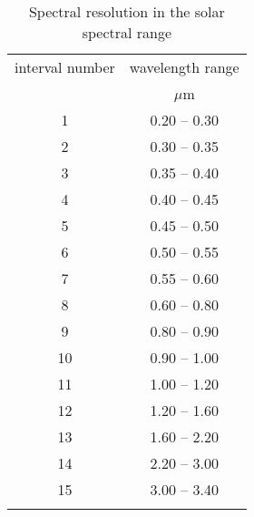 \documentclass[agp]{svjour}
\begin{document}
\begin{table}[b]
\caption[]{Spectral resolution in the solar spectral range}
\begin{tabular*}{84.22mm}{@{\hspace{0pt}\extracolsep{10pt}}cc@{\hspace{0pt}}}
\hline
\noalign{\smallskip}
interval number & wavelength range \\
& $\mu$m \\
\noalign{\smallskip}
\hline
\noalign{\smallskip}
1 & 0.20 -- 0.30 \\
2 & 0.30 -- 0.35 \\
3 & 0.35 -- 0.40 \\
4 & 0.40 -- 0.45 \\
5 & 0.45 -- 0.50 \\
6 & 0.50 -- 0.55 \\
7 & 0.55 -- 0.60 \\
8 & 0.60 -- 0.80 \\
9 & 0.80 -- 0.90 \\
10 & 0.90 -- 1.00 \\
11 & 1.00 -- 1.20 \\
12 & 1.20 -- 1.60 \\
13 & 1.60 -- 2.20 \\
14 & 2.20 -- 3.00 \\
15 & 3.00 -- 3.40 \\
\noalign{\smallskip}
\hline
\end{tabular*}
\label{tab:6}
\end{table}
\end{document}
